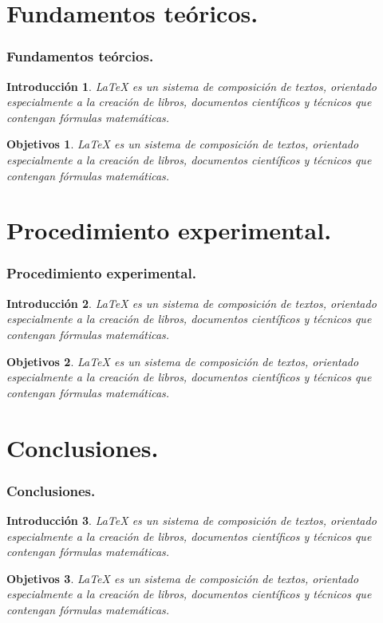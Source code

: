 \documentclass{beamer}
\newtheorem{introduccion}{Introducción}
\newtheorem{objetivos}{Objetivos}
\begin{document}
\section{Fundamentos teóricos.}
\begin{frame}
\frametitle{Fundamentos teórcios.}
\begin{introduccion}
\LaTeX{} es un sistema de composición de textos, orientado especialmente a la creación de libros, 
documentos científicos y técnicos que contengan fórmulas matemáticas. 
\end{introduccion}
\begin{objetivos}
\LaTeX{} es un sistema de composición de textos, orientado especialmente a la creación de libros, 
documentos científicos y técnicos que contengan fórmulas matemáticas. 
\end{objetivos}
\end{frame}


\section{Procedimiento experimental.}
\begin{frame}
\frametitle{Procedimiento experimental.}
\begin{introduccion}
\LaTeX{} es un sistema de composición de textos, orientado especialmente a la creación de libros, 
documentos científicos y técnicos que contengan fórmulas matemáticas. 
\end{introduccion}
\begin{objetivos}
\LaTeX{} es un sistema de composición de textos, orientado especialmente a la creación de libros, 
documentos científicos y técnicos que contengan fórmulas matemáticas. 
\end{objetivos}
\end{frame}


\section{Conclusiones.}
\begin{frame}
\frametitle{Conclusiones.}
\begin{introduccion}
\LaTeX{} es un sistema de composición de textos, orientado especialmente a la creación de libros, 
documentos científicos y técnicos que contengan fórmulas matemáticas. 
\end{introduccion}
\begin{objetivos}
\LaTeX{} es un sistema de composición de textos, orientado especialmente a la creación de libros, 
documentos científicos y técnicos que contengan fórmulas matemáticas. 
\end{objetivos}
\end{frame}
\end{document}
